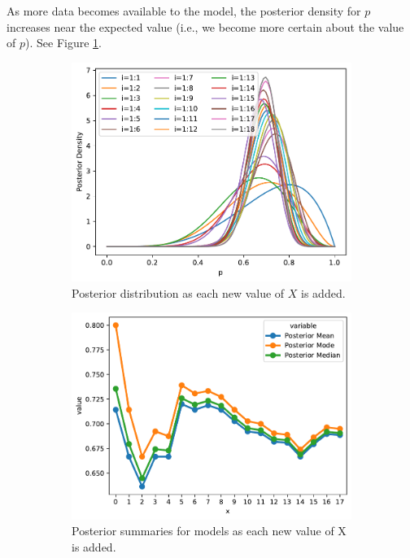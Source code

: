 
As more data becomes available to the model, the posterior density for $p$ increases near the expected value (i.e., we become more certain about the value of $p$). See Figure \ref{figure:iterative_posterior}. 

\begin{figure}[H]
    \centering
    \begin{subfigure}[t]{0.4\textwidth}
        \centering
        \includegraphics[width=\textwidth]{images/bnb_iterative_posterior.pdf}
        \caption{Posterior distribution as each new value of $X$ is added.}
    \end{subfigure}
    \begin{subfigure}[t]{0.4\textwidth}
        \centering
        \includegraphics[width=\textwidth]{images/iterative_posterior_summaries.pdf}
        \caption{Posterior summaries for models as each new value of X is added.}
    \end{subfigure}
    \caption{}
    \label{figure:iterative_posterior}
\end{figure}